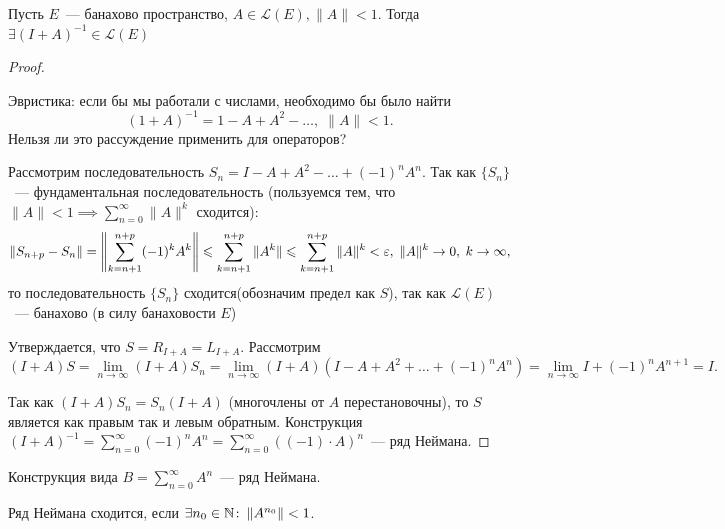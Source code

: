 \begin{theorem}[8.2]\label{theorem8.2}
    Пусть $E$~--- банахово пространство, $A \in \mathcal{L}(E), \|A\| < 1$. Тогда $\exists (I+A)^{-1} \in \mathcal{L}(E)$ 
\end{theorem}
\begin{proof}
    \begin{unnecessary}
        Эвристика: если бы мы работали с числами, необходимо бы было найти $$(1 + A)^{-1} = 1 - A + A^2 - \ldots, \; \|A\| < 1.$$
        Нельзя ли это рассуждение применить для операторов?
    \end{unnecessary}
    Рассмотрим последовательность $S_n = I - A + A^2 - \ldots + (-1)^nA^n$.
    Так как $\{S_n\}$~--- фундаментальная последовательность (пользуемся тем, что $\| A \| < 1 \implies \sum_{n=0}^\infty \| A \|^k$ сходится):
    \[
    \|S_{n + p} - S_n\| = \left\| \sum_{k = n + 1}^{n + p} (-1)^k A^k\right\| \leqslant \sum_{k = n + 1}^{n + p} \|A^k\| \leqslant \sum_{k = n + 1}^{n + p} \|A\|^k < \varepsilon,\;  \|A\|^k \to 0,\; k \to \infty,
    \]
    то последовательность $\{S_n\}$ сходится(обозначим предел как $S$), так как $\mathcal{L}(E)$~--- банахово (в силу банаховости $E$)

    Утверждается, что $S=R_{I+A}=L_{I+A}$. Рассмотрим \[ (I+A)S = \lim\limits_{n \to \infty} (I+A)S_n = \lim\limits_{n \to \infty} (I+A)(I-A+A^2 +\ldots +(-1)^nA^n)=\lim\limits_{n \to \infty} I+(-1)^n A^{n+1}=I. \]

    Так как $(I+A)S_n = S_n(I+A)$ (многочлены от $A$ перестановочны), то $S$ является как правым так и левым обратным.
    Конструкция $(I + A)^{-1} = \sum_{n = 0}^\infty (-1)^n A^n =  \sum_{n = 0}^\infty ((-1) \cdot A)^n$~--- ряд Неймана.
\end{proof}
    
\begin{definition}
    Конструкция вида $B = \sum\limits_{n = 0}^\infty A^n$~--- ряд Неймана.
\end{definition}


\begin{lemmanote}
Ряд Неймана сходится, если $\exists n_0 \in \mathbb{N}\!:\: \|A^{n_0}\| < 1$.
\end{lemmanote}


